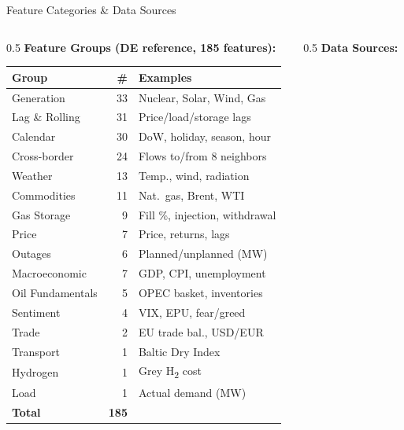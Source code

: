 \documentclass[aspectratio=169]{beamer}
\begin{document}
\begin{frame}{Feature Categories \& Data Sources}
\begin{columns}
\begin{column}{0.5\textwidth}
\textbf{Feature Groups (DE reference, 185 features):}
\vspace{0.1cm}

\begin{table}
\scriptsize
\begin{tabular}{l r l}
\toprule
\textbf{Group} & \textbf{\#} & \textbf{Examples} \\
\midrule
Generation    & 33 & Nuclear, Solar, Wind, Gas \\
Lag \& Rolling & 31 & Price/load/storage lags \\
Calendar      & 30 & DoW, holiday, season, hour \\
Cross-border  & 24 & Flows to/from 8 neighbors \\
Weather       & 13 & Temp., wind, radiation \\
Commodities   & 11 & Nat.\ gas, Brent, WTI \\
Gas Storage   &  9 & Fill \%, injection, withdrawal \\
Price         &  7 & Price, returns, lags \\
Outages       &  6 & Planned/unplanned (MW) \\
Macroeconomic &  7 & GDP, CPI, unemployment \\
Oil Fundamentals & 5 & OPEC basket, inventories \\
Sentiment     &  4 & VIX, EPU, fear/greed \\
Trade         &  2 & EU trade bal., USD/EUR \\
Transport     &  1 & Baltic Dry Index \\
Hydrogen      &  1 & Grey H\textsubscript{2} cost \\
Load          &  1 & Actual demand (MW) \\
\midrule
\textbf{Total} & \textbf{185} & \\
\bottomrule
\end{tabular}
\end{table}
\end{column}

\begin{column}{0.5\textwidth}
\textbf{Data Sources:}
\vspace{0.1cm}


\end{column}
\end{columns}
\end{frame}
\end{document}
